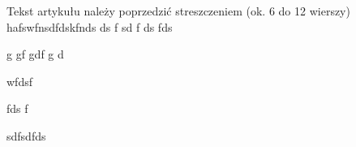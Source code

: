 \documentclass[11pt,twoside]{article}
\begin{document}
 Tekst artykułu należy poprzedzić streszczeniem (ok. 6 do 12 wierszy) 
 hafswfnsdfdskfnds ds
  f
  sd
  f
  ds
  fds

g
gf
gdf
g
d


wfdsf

fds
f


sdfsdfds
\end{document}
